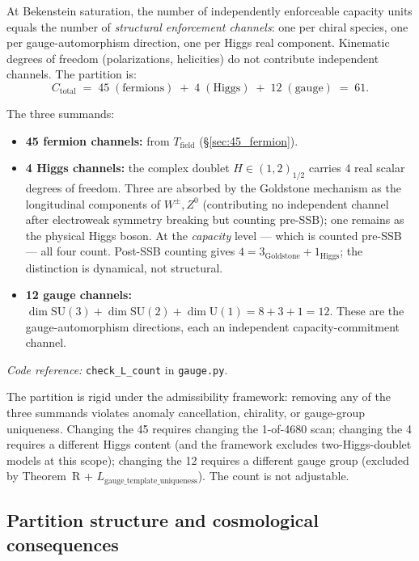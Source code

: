 \documentclass[11pt]{article}
\newcommand{\coderef}[2]{\smallskip\noindent\textit{Code reference:} \texttt{#1} in \texttt{#2}.}
\newcommand{\SU}{\mathrm{SU}}
\newcommand{\Un}{\mathrm{U}}
\newcommand{\epitag}[1]{\textbf{[#1]}}
\theoremstyle{definition}
\begin{document}
\begin{tcolorbox}[apfbox, title={$L_{\mathrm{count}}$ (Capacity counting) \epitag{P}}]
At Bekenstein saturation, the number of independently enforceable capacity units equals the number of \emph{structural enforcement channels}: one per chiral species, one per gauge-automorphism direction, one per Higgs real component. Kinematic degrees of freedom (polarizations, helicities) do not contribute independent channels. The partition is:
\[
C_{\mathrm{total}} \;=\; 45 \; (\text{fermions}) \;+\; 4 \; (\text{Higgs}) \;+\; 12 \; (\text{gauge}) \;=\; 61.
\]
\end{tcolorbox}

The three summands:
\begin{itemize}
    \item \textbf{45 fermion channels:} from $T_{\mathrm{field}}$ (\S\ref{sec:45_fermion}).
    \item \textbf{4 Higgs channels:} the complex doublet $H \in (1, 2)_{1/2}$ carries 4 real scalar degrees of freedom. Three are absorbed by the Goldstone mechanism as the longitudinal components of $W^\pm, Z^0$ (contributing no independent channel after electroweak symmetry breaking but counting pre-SSB); one remains as the physical Higgs boson. At the \emph{capacity} level --- which is counted pre-SSB --- all four count. Post-SSB counting gives $4 = 3_{\mathrm{Goldstone}} + 1_{\mathrm{Higgs}}$; the distinction is dynamical, not structural.
    \item \textbf{12 gauge channels:} $\dim \SU(3) + \dim \SU(2) + \dim \Un(1) = 8 + 3 + 1 = 12$. These are the gauge-automorphism directions, each an independent capacity-commitment channel.
\end{itemize}

\coderef{check\_L\_count}{gauge.py}

The partition is rigid under the admissibility framework: removing any of the three summands violates anomaly cancellation, chirality, or gauge-group uniqueness. Changing the 45 requires changing the 1-of-4680 scan; changing the 4 requires a different Higgs content (and the framework excludes two-Higgs-doublet models at this scope); changing the 12 requires a different gauge group (excluded by Theorem~R + $L_{\mathrm{gauge\_template\_uniqueness}}$). The count is not adjustable.

\subsection{Partition structure and cosmological consequences}\label{sec:61_cosmological}
\end{document}
